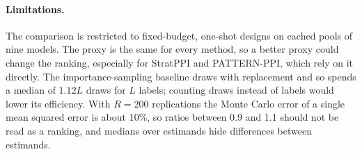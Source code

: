 \paragraph{Limitations.} The comparison is restricted to fixed-budget, one-shot designs on cached pools of nine models. The proxy is the same for every method, so a better proxy could change the ranking, especially for StratPPI and PATTERN-PPI, which rely on it directly. The importance-sampling baseline draws with replacement and so spends a median of $1.12L$ draws for $L$ labels; counting draws instead of labels would lower its efficiency. With $R=200$ replications the Monte Carlo error of a single mean squared error is about 10\%, so ratios between 0.9 and 1.1 should not be read as a ranking, and medians over estimands hide differences between estimands.
